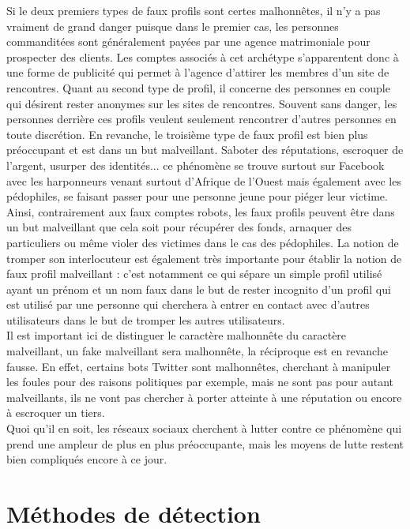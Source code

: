 \documentclass[12pt]{report}
\begin{document}
Si le deux premiers types de faux profils sont certes malhonnêtes, il n’y a pas vraiment de grand danger puisque dans le premier cas, les personnes commanditées sont généralement payées par une agence matrimoniale pour prospecter des clients. Les comptes associés à cet archétype s’apparentent donc à une forme de publicité qui permet à l’agence d’attirer les membres d’un site de rencontres. Quant au second type de profil, il concerne des personnes en couple qui désirent rester anonymes sur les sites de rencontres. Souvent sans danger, les personnes derrière ces profils veulent seulement rencontrer d’autres personnes en toute discrétion. En revanche, le troisième type de faux profil est bien plus préoccupant et est dans un but malveillant. Saboter des réputations, escroquer de l'argent, usurper des identités... ce phénomène se trouve surtout sur Facebook avec les harponneurs venant surtout d'Afrique de l'Ouest mais également avec les pédophiles, se faisant passer pour une personne jeune pour piéger leur victime.\\ 

Ainsi, contrairement aux faux comptes robots, les faux profils peuvent être dans un but malveillant que cela soit pour récupérer des fonds, arnaquer des particuliers ou même violer des victimes dans le cas des pédophiles. La notion de tromper son interlocuteur est également très importante pour établir la notion de faux profil malveillant : c'est notamment ce qui sépare un simple profil utilisé ayant un prénom et un nom faux dans le but de rester incognito d'un profil qui est utilisé par une personne qui cherchera à entrer en contact avec d'autres utilisateurs dans le but de tromper les autres utilisateurs. \\

Il est important ici de distinguer le caractère malhonnête du caractère malveillant, un fake malveillant sera malhonnête, la réciproque est en revanche fausse. En effet, certains bots Twitter sont malhonnêtes, cherchant à manipuler les foules pour des raisons politiques par exemple, mais ne sont pas pour autant malveillants, ils ne vont pas chercher à porter atteinte à une réputation ou encore à escroquer un tiers. \\

Quoi qu'il en soit, les réseaux sociaux cherchent à lutter contre ce phénomène qui prend une ampleur de plus en plus préoccupante, mais les moyens de lutte restent bien compliqués encore à ce jour.

\chapter{Méthodes de détection}
\end{document}
